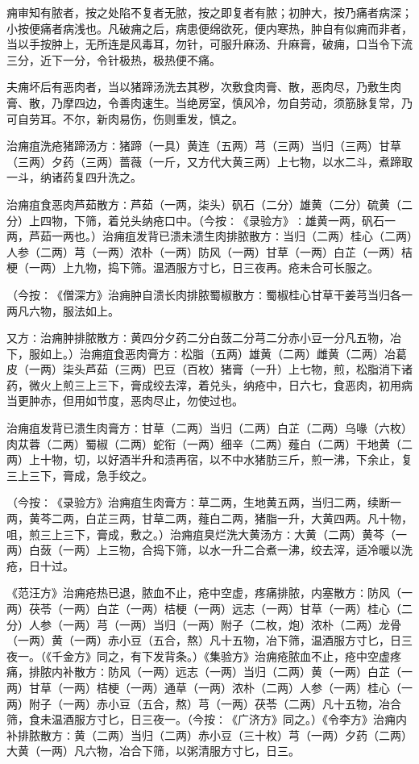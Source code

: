 \documentclass[a4paper,12pt,UTF8,twoside]{ctexbook}
\begin{document}
痈审知有脓者，按之处陷不复者无脓，按之即复者有脓；初肿大，按乃痛者病深；小按便痛者病浅也。凡破痈之后，病患便绵欲死，便内寒热，肿自有似痈而非者，当以手按肿上，无所连是风毒耳，勿针，可服升麻汤、升麻膏，破痈，口当令下流三分，近下一分，令针极热，极热便不痛。

夫痈坏后有恶肉者，当以猪蹄汤洗去其秽，次敷食肉膏、散，恶肉尽，乃敷生肉膏、散，乃摩四边，令善肉速生。当绝房室，慎风冷，勿自劳动，须筋脉复常，乃可自劳耳。不尔，新肉易伤，伤则重发，慎之。

治痈疽洗疮猪蹄汤方∶猪蹄（一具）黄连（五两）芎（三两）当归（三两）甘草（三两）夕药（三两）蔷薇（一斤，又方代大黄三两）上七物，以水二斗，煮蹄取一斗，纳诸药复四升洗之。

治痈疽食恶肉芦茹散方∶芦茹（一两，柒头）矾石（二分）雄黄（二分）硫黄（二分）上四物，下筛，着兑头纳疮口中。（今按∶《录验方》∶雄黄一两，矾石一两，芦茹一两也。）治痈疽发背已溃未溃生肉排脓散方∶当归（二两）桂心（二两）人参（二两）芎（一两）浓朴（一两）防风（一两）甘草（一两）白芷（一两）桔梗（一两）上九物，捣下筛。温酒服方寸匕，日三夜再。疮未合可长服之。

（今按∶《僧深方》治痈肿自溃长肉排脓蜀椒散方∶蜀椒桂心甘草干姜芎当归各一两凡六物，服法如上。

又方∶治痈肿排脓散方∶黄四分夕药二分白蔹二分芎二分赤小豆一分凡五物，冶下，服如上。）治痈疽食恶肉膏方∶松脂（五两）雄黄（二两）雌黄（二两）冶葛皮（一两）柒头芦茹（三两）巴豆（百枚）猪膏（一升）上七物，煎，松脂消下诸药，微火上煎三上三下，膏成绞去滓，着兑头，纳疮中，日六七，食恶肉，初用病当更肿赤，但用如节度，恶肉尽止，勿使过也。

治痈疽发背已溃生肉膏方∶甘草（二两）当归（二两）白芷（二两）乌喙（六枚）肉苁蓉（二两）蜀椒（二两）蛇衔（一两）细辛（二两）薤白（二两）干地黄（二两）上十物，切，以好酒半升和渍再宿，以不中水猪肪三斤，煎一沸，下余止，复三上三下，膏成，急手绞之。

（今按∶《录验方》治痈疽生肉膏方∶草二两，生地黄五两，当归二两，续断一两，黄芩二两，白芷三两，甘草二两，薤白二两，猪脂一升，大黄四两。凡十物，咀，煎三上三下，膏成，敷之。）治痈疽臭烂洗大黄汤方∶大黄（二两）黄芩（一两）白蔹（一两）上三物，合捣下筛，以水一升二合煮一沸，绞去滓，适冷暖以洗疮，日十过。

《范汪方》治痈疮热已退，脓血不止，疮中空虚，疼痛排脓，内塞散方∶防风（一两）茯苓（一两）白芷（一两）桔梗（一两）远志（一两）甘草（一两）桂心（二分）人参（一两）芎（一两）当归（一两）附子（二枚，炮）浓朴（二两）龙骨（一两）黄（一两）赤小豆（五合，熬）凡十五物，冶下筛，温酒服方寸匕，日三夜一。（《千金方》同之，有下发背条。）《集验方》治痈疮脓血不止，疮中空虚疼痛，排脓内补散方∶防风（一两）远志（一两）当归（二两）黄（一两）白芷（一两）甘草（一两）桔梗（一两）通草（一两）浓朴（二两）人参（一两）桂心（一两）附子（一两）赤小豆（五合，熬）芎（一两）茯苓（二两）凡十五物，冶合筛，食未温酒服方寸匕，日三夜一。（今按∶《广济方》同之。）《令李方》治痈内补排脓散方∶黄（二两）当归（二两）赤小豆（三十枚）芎（一两）夕药（二两）大黄（一两）凡六物，冶合下筛，以粥清服方寸匕，日三。
\end{document}
